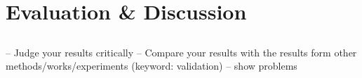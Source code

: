\chapter{Evaluation \& Discussion}
\label{chap:4}

\section{}
\bigskip





%

-- Judge your results critically
-- Compare your results with the results form other methods/works/experiments (keyword: validation)
-- show problems

